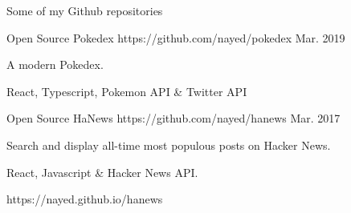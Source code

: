 {Some of my Github repositories}

\begin{cventries}

  \cventry
  {Open Source} %
  {Pokedex} %
  {https://github.com/nayed/pokedex} %
  {Mar. 2019} %
    {
      \begin{cvitems} %
      \item {A modern Pokedex.}
      \item {React, Typescript, Pokemon API \& Twitter API}
      \end{cvitems}
    }
  \cventry
  {Open Source} %
  {HaNews} %
  {https://github.com/nayed/hanews} %
  {Mar. 2017} %
    {
      \begin{cvitems} %
      \item {Search and display all-time most populous posts on Hacker News.}
      \item {React, Javascript \& Hacker News API.}
      \item {https://nayed.github.io/hanews}
      \end{cvitems}
    }
\end{cventries}
